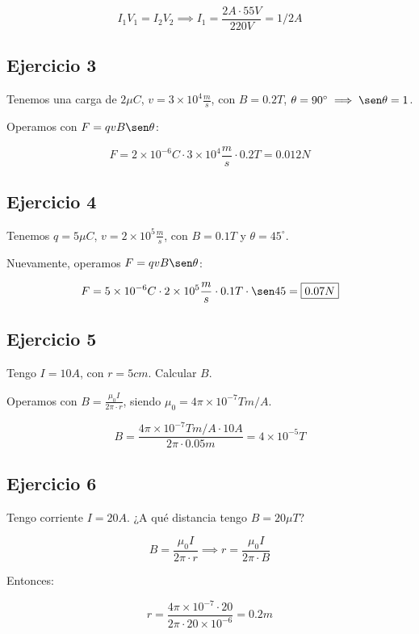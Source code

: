 \begin{equation*}
    I_1V_1 = I_2V_2 \implies I_1 = \frac{2 A\cdot55V}{220V} = \boxed{1/2 A}
\end{equation*}

\subsection{Ejercicio 3}


Tenemos una carga de \(2\mu C\), \(v = 3\times10^{4}\frac{m}{s}\),
con \(B = 0.2T\), \(\theta=90^{\circ}\implies\sen\theta=1\).

Operamos con \(F = qvB\sen\theta\):

\begin{equation*}
    F = 2\times10^{-6} C \cdot 3\times10^{4}\frac{m}{s} \cdot 0.2T = \boxed{0.012N}
\end{equation*}

\subsection{Ejercicio 4}

Tenemos \(q = 5\mu C\), \(v = 2\times10^{5}\frac{m}{s}\),
con \(B=0.1T\) y \(\theta = 45^{\circ}\).

Nuevamente, operamos \(F = qvB\sen\theta\):

\begin{equation*}
    F = 5\times10^{-6}C \cdot 2\times10^{5}\frac{m}{s} \cdot 0.1T \cdot \sen45 = \boxed{0.07 N}
\end{equation*}

\subsection{Ejercicio 5}

Tengo \(I = 10A\), con \(r=5cm\).
Calcular \(B\).

Operamos con \(B = \frac{\mu_0I}{2\pi\cdot r}\),
siendo \(\mu_0 = 4\pi\times10^{-7}Tm/A\).

\begin{equation*}
    B = \frac{4\pi\times10^{-7}Tm/A\cdot10A}{2\pi\cdot 0.05m}=\boxed{4\times10^{-5}T}
\end{equation*}

\subsection{Ejercicio 6}

Tengo corriente \(I = 20A\).
¿A qué distancia tengo \(B = 20 \mu T\)?

\begin{equation*}
    B = \frac{\mu_0I}{2\pi\cdot r} \implies r = \frac{\mu_0I}{2\pi\cdot B}
\end{equation*}

Entonces:

\begin{equation*}
    r = \frac{4\pi\times10^{-7}\cdot20}{2\pi\cdot 20\times10^{-6}} = \boxed{0.2m}
\end{equation*}